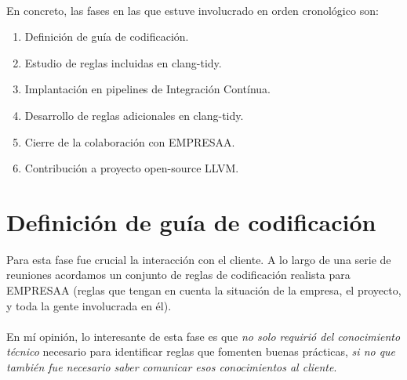 \documentclass[12pt]{extreport} %
\begin{document}
\paragraph{}
En concreto, las fases en las que estuve involucrado en orden
cronológico son:
\begin{enumerate}
\item Definición de guía de codificación.
\item Estudio de reglas incluidas en clang-tidy.
\item Implantación en pipelines de Integración Contínua.
\item Desarrollo de reglas adicionales en clang-tidy.
\item Cierre de la colaboración con EMPRESAA.
\item Contribución a proyecto open-source LLVM.
\end{enumerate}

\section{Definición de guía de codificación}
\label{fase-1}

Para esta fase fue crucial la interacción con el cliente. A lo largo
de una serie de reuniones acordamos un conjunto de reglas de
codificación realista para EMPRESAA (reglas que tengan en cuenta la
situación de la empresa, el proyecto, y toda la gente involucrada en
él).

\paragraph{}
En mí opinión, lo interesante de esta fase es que \emph{no solo
requirió del conocimiento técnico} necesario para identificar reglas
que fomenten buenas prácticas, \emph{si no que también fue necesario
saber comunicar esos conocimientos al cliente}.
\end{document}
